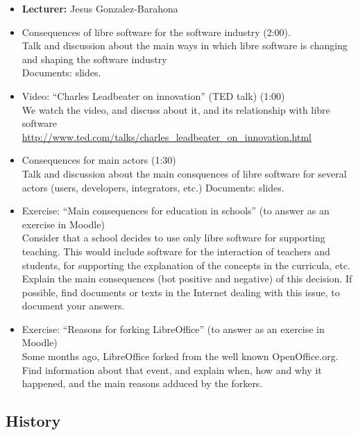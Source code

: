 \documentclass[a4paper]{article}
\begin{document}
\begin{itemize}
\item \textbf{Lecturer:} Jesus Gonzalez-Barahona

\item Consequences of libre software for the software industry (2:00). \\
  Talk and discussion about the main ways in which libre software is changing and shaping the software industry \\
  Documents: slides.

\item Video: ``Charles Leadbeater on innovation'' (TED talk) (1:00) \\
  We watch the video, and discuss about it, and its relationship with libre software \\
  \url{http://www.ted.com/talks/charles_leadbeater_on_innovation.html}
\item Consequences for main actors (1:30) \\
  Talk and discussion about the main consquences of libre software for several actors (users, developers, integrators, etc.)
  Documents: slides.

\item Exercise: ``Main consequences for education in schools'' (to answer as an exercise in Moodle) \\
Consider that a school decides to use only libre software for supporting teaching. This would include software for the interaction of teachers and students, for supporting the explanation of the concepts in the curricula, etc. Explain the main consequences (bot positive and negative) of this decision. If possible, find documents or texts in the Internet dealing with this issue, to document your answers.
\item Exercise: ``Reasons for forking LibreOffice'' (to answer as an exercise in Moodle) \\
  Some months ago, LibreOffice forked from the well known OpenOffice.org. Find information about that event, and explain when, how and why it happened, and the main reasons adduced by the forkers.
\end{itemize}

\subsection{History}
\end{document}
